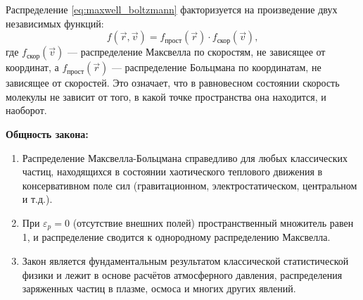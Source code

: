 \begin{property}
Распределение \eqref{eq:maxwell_boltzmann} факторизуется на произведение двух независимых функций:
\begin{equation}
    f(\vec{r}, \vec{v}) = f_{\text{прост}}(\vec{r}) \cdot f_{\text{скор}}(\vec{v}),
\end{equation}
где $f_{\text{скор}}(\vec{v})$ --- распределение Максвелла по скоростям, не зависящее от координат, а $f_{\text{прост}}(\vec{r})$ --- распределение Больцмана по координатам, не зависящее от скоростей. Это означает, что в равновесном состоянии скорость молекулы не зависит от того, в какой точке пространства она находится, и наоборот.
\end{property}

\begin{remark}
\textbf{Общность закона:}
\begin{enumerate}
    \item Распределение Максвелла-Больцмана справедливо для любых классических частиц, находящихся в состоянии хаотического теплового движения в консервативном поле сил (гравитационном, электростатическом, центральном и т.д.).
    \item При $\varepsilon_p = 0$ (отсутствие внешних полей) пространственный множитель равен 1, и распределение сводится к однородному распределению Максвелла.
    \item Закон является фундаментальным результатом классической статистической физики и лежит в основе расчётов атмосферного давления, распределения заряженных частиц в плазме, осмоса и многих других явлений.
\end{enumerate}
\end{remark}

